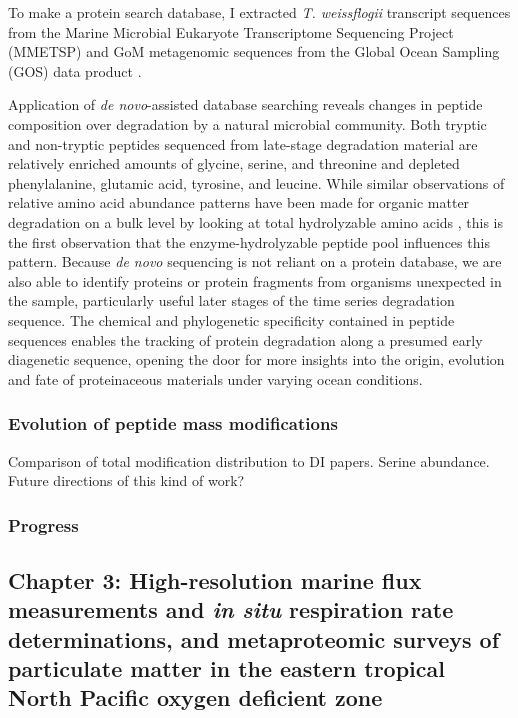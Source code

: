 \documentclass[12pt, letterpaper, twoside]{article}
\begin{document}
To make a protein search database, I extracted \textit{T. weissflogii} transcript sequences from the Marine Microbial Eukaryote Transcriptome Sequencing Project (MMETSP) \cite{keeling_marine_2014} and GoM metagenomic sequences from the Global Ocean Sampling (GOS) data product \cite{yooseph_sorcerer_2007}.
 
 Application of \textit{de novo}-assisted database searching reveals changes in peptide composition over degradation by a natural microbial community. Both tryptic and non-tryptic peptides sequenced from late-stage degradation material are relatively enriched amounts of glycine, serine, and threonine and depleted phenylalanine, glutamic acid, tyrosine, and leucine. While similar observations of relative amino acid abundance patterns have been made for organic matter degradation on a bulk level by looking at total hydrolyzable amino acids \cite{dauwe_linking_1999}, this is the first observation that the enzyme-hydrolyzable peptide pool influences this pattern. Because \textit{de novo} sequencing is not reliant on a protein database, we are also able to identify proteins or protein fragments from organisms unexpected in the sample, particularly useful later stages of the time series degradation sequence. The chemical and phylogenetic specificity contained in peptide sequences enables the tracking of protein degradation along a presumed early diagenetic sequence, opening the door for more insights into the origin, evolution and fate of proteinaceous materials under varying ocean conditions.

\subsubsection{Evolution of peptide mass modifications}

Comparison of total modification distribution to DI papers. Serine abundance. Future directions of this kind of work?

\subsubsection*{Progress}



\subsection{Chapter 3: High-resolution marine flux measurements and \textit{in situ} respiration rate determinations, and metaproteomic surveys of particulate matter in the eastern tropical North Pacific oxygen deficient zone}
\end{document}
